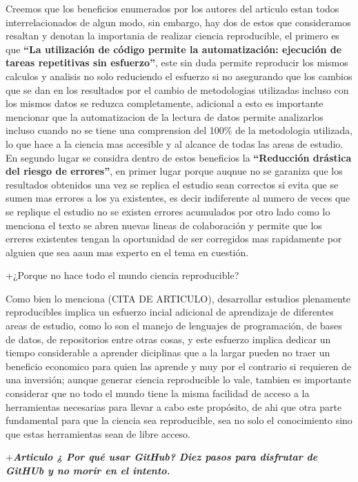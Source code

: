 \documentclass[
]{article}
\begin{document}
Creemos que los beneficios enumerados por los autores del articulo estan
todos interrelacionados de algun modo, sin embargo, hay dos de estos que
consideramos resaltan y denotan la importania de realizar ciencia
reproducible, el primero es que \textbf{``La utilización de código
permite la automatización: ejecución de tareas repetitivas sin
esfuerzo''}, este sin duda permite reproducir los mismos calculos y
analisis no solo reduciendo el esfuerzo si no asegurando que los cambios
que se dan en los resultados por el cambio de metodologias utilizadas
incluso con los mismos datos se reduzca completamente, adicional a esto
es importante mencionar que la automatizacion de la lectura de datos
permite analizarlos incluso cuando no se tiene una comprension del 100\%
de la metodologia utilizada, lo que hace a la ciencia mas accesible y al
alcance de todas las areas de estudio. En segundo lugar se considra
dentro de estos beneficios la \textbf{``Reducción drástica del riesgo de
errores''}, en primer lugar porque auqnue no se garaniza que los
resultados obtenidos una vez se replica el estudio sean correctos si
evita que se sumen mas errores a los ya existentes, es decir indiferente
al numero de veces que se replique el estudio no se existen errores
acumulados por otro lado como lo menciona el texto se abren nuevas
lineas de colaboración y permite que los erreres existentes tengan la
oportunidad de ser corregidos mas rapidamente por alguien que sea aaun
mas experto en el tema en cuestión.

+¿Porque no hace todo el mundo ciencia reproducible?

Como bien lo menciona (CITA DE ARTICULO), desarrollar estudios
plenamente reproducibles implica un esfuerzo incial adicional de
aprendizaje de diferentes areas de estudio, como lo son el manejo de
lenguajes de programación, de bases de datos, de repositorios entre
otras cosas, y este esfuerzo implica dedicar un tiempo considerable a
aprender diciplinas que a la largar pueden no traer un beneficio
economico para quien las aprende y muy por el contrario si requieren de
una inversión; aunque generar ciencia reproducible lo vale, tambien es
importante considerar que no todo el mundo tiene la misma facilidad de
acceso a la herramientas necesarias para llevar a cabo este propósito,
de ahi que otra parte fundamental para que la ciencia sea reproducible,
sea no solo el conocimiento sino que estas herramientas sean de libre
acceso.

+\textbf{\emph{Articulo ¿ Por qué usar GitHub? Diez pasos para disfrutar
de GitHUb y no morir en el intento. }}
\end{document}
